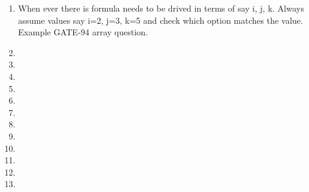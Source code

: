 \begin{enumerate}
    \item   When ever there is formula needs to be drived in terms of say i, j, k.
            Always assume values say i=2, j=3, k=5 and check which option matches the value. Example GATE-94 array question.
    \item
    \item
    \item
    \item
    \item
    \item
    \item
    \item
    \item
    \item
    \item
    \item

\end{enumerate}
